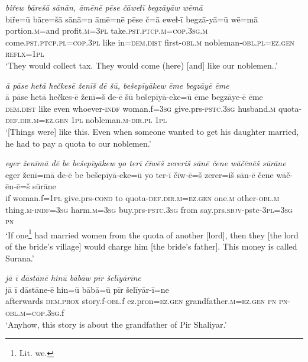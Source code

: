 \ea \label{BP.12}
\textit{biřew bārešā sānān, āmēnē pēse čāweɫī begzāyāw wēmā} \\ 
\gll biře=ū bāre=šā sānā=n āmē=nē pēse č=ā eweɫ-ī begzā-yā=ū wē=mā \\ 
 portion\textsc{.m}=and profit\textsc{.m}\textsc{=3pl} take\textsc{.pst}\textsc{.ptcp}\textsc{.m}\textsc{=cop}\textsc{.3sg}\textsc{.m} come\textsc{.pst}\textsc{.ptcp}\textsc{.pl}\textsc{=cop}\textsc{.3pl} like in=\textsc{dem.dist} first\textsc{-obl}\textsc{.m} nobleman\textsc{-obl}\textsc{.pl}\textsc{=ez.gen} \textsc{reflx}\textsc{=\textsc{1pl}} \\ 
\glt `They would collect tax. They would come (here) [and] like our noblemen..'
\z 
 
\ea \label{BP.17}
\textit{ā pāse hetā hečkesē ženīš dē šū, bešepīyākew ēme begzāyē ēme} \\ 
\gll ā pāse hetā hečkes-ē ženī=š de-ē šū bešepīyā-eke=ū ēme begzāye-ē ēme \\ 
 \textsc{dem.dist} like even whoever\textsc{-indf} woman.f\textsc{=3sg} give.prs\textsc{-pstc}\textsc{.3sg} husband\textsc{.m} quota\textsc{-def}\textsc{.dir}\textsc{.m}\textsc{=ez.gen} \textsc{1pl} nobleman\textsc{.m}\textsc{-dir}\textsc{.pl} \textsc{1pl} \\ 
\glt `[Things were] like this. Even when someone wanted to get his daughter married, he had to pay a quota  to our noblemen.'
\z 
 
\ea \label{BP.18}
\textit{eger ženīmā dē be bešepīyākew yo terī čīwēš zereriš sānē čene wāčēnēš sūrāne} \\ 
\gll eger ženī=mā de-ē be bešepīyā-eke=ū yo ter-ī čīw-ē=š zerer=iš sān-ē čene wāč-ēn-ē=š sūrāne \\ 
 if woman.f\textsc{=\textsc{1pl}} give.prs\textsc{-cond} to quota\textsc{-def}\textsc{.dir}\textsc{.m}\textsc{=ez.gen} one\textsc{.m} other\textsc{-obl}\textsc{.m} thing\textsc{.m}\textsc{-indf}\textsc{=3sg} harm\textsc{.m}\textsc{=3sg} buy.prs\textsc{-pstc}\textsc{.3sg} from say.prs.\textsc{sbjv-}pstc\textsc{-3pl}\textsc{=3sg} \textsc{pn} \\ 
\glt `If one\footnote{Lit. we.} had married women from the quota of another [lord], then they [the lord of the bride's village] would charge him [the bride’s father]. This money is called Surana.'
\z 
 
\ea \label{BP.20}
\textit{jā ī dāstānē hinū bābāw pīr šelīyārīne} \\ 
\gll jā ī dāstāne-ē hin=ū bābā=ū pīr šelīyār-ī=ne \\ 
 afterwards \textsc{dem.prox} story.f\textsc{-obl}.f ez.pron\textsc{=ez.gen} grandfather\textsc{.m}\textsc{=ez.gen} \textsc{pn} \textsc{pn}\textsc{-obl}\textsc{.m}\textsc{=cop}\textsc{.3sg}.f \\ 
\glt `Anyhow, this story is about the grandfather of Pir Shaliyar.'
\z 
 
